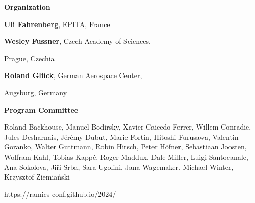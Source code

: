 \documentclass[a3paper, 12pt]{article}
\begin{document}
\begin{minipage}[t]{.43\linewidth}


  \medskip
  

  \vspace*{7ex}
  
  \hfill {\Large \bf Organization}

  \smallskip

  \hfill \textbf{Uli Fahrenberg}, EPITA, France

  \hfill \textbf{Wesley Fussner}, Czech Academy of Sciences,

  \hfill Prague, Czechia

  \hfill \textbf{Roland Glück}, German Aerospace Center,

  \hfill Augsburg, Germany

  \bigskip

  \hfill {\Large \bf Program Committee}

  \smallskip

  Roland Backhouse,
  Manuel Bodirsky,
  Xavier Caicedo Ferrer,
  Willem Conradie,
  Jules Desharnais,
  Jérémy Dubut,
  Marie Fortin,
  Hitoshi Furusawa,
  Valentin Goranko,
  Walter Guttmann,
  Robin Hirsch,
  Peter Höfner,
  Sebastiaan Joosten,
  Wolfram Kahl,
  Tobias Kappé,
  Roger Maddux,
  Dale Miller,
  Luigi Santocanale,
  Ana Sokolova,
  Jiři Srba,
  Sara Ugolini,
  Jana Wagemaker,
  Michael Winter,
  Krzysztof Ziemiański

  \vspace{8ex}

  \hspace*{-15ex} {\fontsize{30}{40}\selectfont https://ramics-conf.github.io/2024/}

  \vspace*{-2ex}

\end{minipage}
\end{document}
